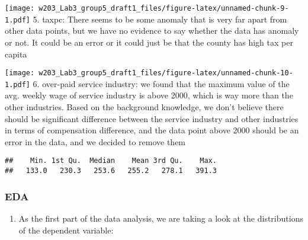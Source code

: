 \documentclass[]{article}
\newenvironment{Shaded}{\begin{snugshade}}{\end{snugshade}}
\newcommand{\KeywordTok}[1]{\textcolor[rgb]{0.13,0.29,0.53}{\textbf{#1}}}
\newcommand{\DataTypeTok}[1]{\textcolor[rgb]{0.13,0.29,0.53}{#1}}
\newcommand{\DecValTok}[1]{\textcolor[rgb]{0.00,0.00,0.81}{#1}}
\newcommand{\StringTok}[1]{\textcolor[rgb]{0.31,0.60,0.02}{#1}}
\newcommand{\OperatorTok}[1]{\textcolor[rgb]{0.81,0.36,0.00}{\textbf{#1}}}
\newcommand{\NormalTok}[1]{#1}
\providecommand{\tightlist}{%
  \setlength{\itemsep}{0pt}\setlength{\parskip}{0pt}}
\begin{document}
\texttt{[image: w203\_Lab3\_group5\_draft1\_files/figure-latex/unnamed-chunk-9-1.pdf]}
5. taxpc: There seems to be some anomaly that is very far apart from
other data points, but we have no evidence to say whether the data has
anomaly or not. It could be an error or it could just be that the county
has high tax per capita

\begin{Shaded}
\end{Shaded}

\texttt{[image: w203\_Lab3\_group5\_draft1\_files/figure-latex/unnamed-chunk-10-1.pdf]}
6. over-paid service industry: we found that the maximum value of the
avg. weekly wage of service industry is above 2000, which is way more
than the other industries. Based on the background knowledge, we don't
believe there should be significant difference between the service
industry and other industries in terms of compensation difference, and
the data point above 2000 should be an error in the data, and we decided
to remove them

\begin{Shaded}
\end{Shaded}

\begin{verbatim}
##    Min. 1st Qu.  Median    Mean 3rd Qu.    Max. 
##   133.0   230.3   253.6   255.2   278.1   391.3
\end{verbatim}

\subsubsection{EDA}\label{eda}

\begin{enumerate}
\def\labelenumi{\arabic{enumi}.}
\tightlist
\item
  As the first part of the data analysis, we are taking a look at the
  distributions of the dependent variable:
\end{enumerate}
\end{document}
